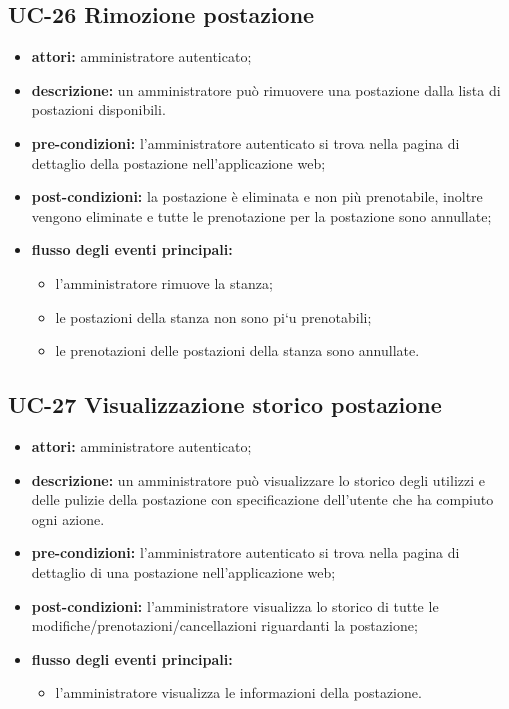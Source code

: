 \subsection{UC-26 Rimozione postazione}
\begin{itemize}
    \item \textbf{attori:} amministratore autenticato;
    \item \textbf{descrizione:} un amministratore pu\`{o} rimuovere una postazione dalla lista di postazioni disponibili.
    \item \textbf{pre-condizioni:} l'amministratore autenticato si trova nella pagina di dettaglio della postazione nell'applicazione web;
    \item \textbf{post-condizioni:} la postazione \`{e} eliminata e non pi\`{u} prenotabile, inoltre vengono eliminate e  tutte le prenotazione per la postazione sono annullate;
    \item \textbf{flusso degli eventi principali:}
    \begin{itemize}
        \item l'amministratore rimuove la stanza;
        \item le postazioni della stanza non sono pi`{u} prenotabili;
        \item le prenotazioni delle postazioni della stanza sono annullate.
    \end{itemize}
\end{itemize}


\subsection{UC-27 Visualizzazione storico postazione}
\begin{itemize}
    \item \textbf{attori:} amministratore autenticato;
    \item \textbf{descrizione:} un amministratore pu\`{o} visualizzare lo storico degli utilizzi e delle pulizie della postazione con specificazione dell'utente che ha compiuto ogni azione.
    \item \textbf{pre-condizioni:} l'amministratore autenticato si trova nella pagina di dettaglio di una postazione nell'applicazione web;
    \item \textbf{post-condizioni:} l'amministratore visualizza lo storico di tutte le modifiche/prenotazioni/cancellazioni riguardanti la postazione;
    \item \textbf{flusso degli eventi principali:}
    \begin{itemize}
        \item l'amministratore visualizza le informazioni della postazione.
    \end{itemize}
\end{itemize}



